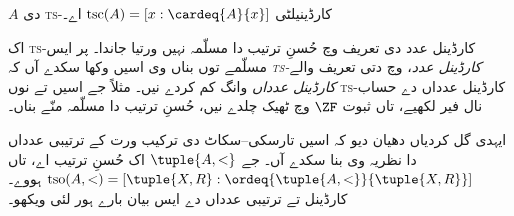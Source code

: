 \documentclass[../../../include/open-logic-section]{subfiles}
\begin{document}
\begin{defn}
$A$ دی \textsc{ts}-کارڈینیلٹی $\text{tsc}(A) = [x :
\cardeq{A}{x}]$ اے۔
\end{defn}

اک \textsc{ts}-کارڈینل عدد دی تعریف وچ حُسنِ ترتیب دا مسلّمہ نہیں ورتیا جاندا۔ پر ایس مسلّمے توں بناں وی اسیں وکھا سکدے آں کہ \emph{\textsc{ts}-کارڈینل عدد}،  وچ دتی تعریف والے \emph{کارڈینل عدداں} وانگ کم کردے نیں۔ مثلاً جے اسیں  تے  نوں \textsc{ts}-کارڈینل عدداں دے حساب نال فیر لکھیے، تاں ثبوت $\ZF$ وچ ٹھیک چلدے نیں، حُسنِ ترتیب دا مسلّمہ منّے بناں۔

ایہدی گل کردیاں دھیان دیو کہ اسیں تارسکی–سکاٹ دی ترکیب ورت کے ترتیبی عدداں دا نظریہ وی بنا سکدے آں۔ جے $\tuple{A, <}$ اک حُسنِ ترتیب اے، تاں $\text{tso}(A, <) = [\tuple{X,
R} : \ordeq{\tuple{A, <}}{\tuple{X, R}}]$ ہووے۔ کارڈینل تے ترتیبی عدداں دے ایس بیان بارے ہور لئی \citet[chs.~9--12]{Potter2004} ویکھو۔
\end{document}
